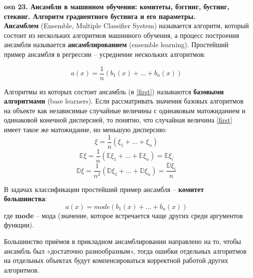 \renewcommand{\theequation}{\arabic{equation}}
\setcounter{equation}{0}


\textbf{\LARGE osn 23. Ансамбли в машинном обучении: комитеты, бэггинг, бустинг, стекинг. Алгоритм градиентного бустинга и его параметры.}  \\
\textbf{Ансамблем} (Ensemble, Multiple Classifier System) называется алгоритм, который состоит из нескольких алгоритмов машинного обучения, а процесс построения ансамбля называется \textbf {ансамблированием} (ensemble learning). Простейший пример ансамбля в регрессии – усреднение нескольких алгоритмов:

\begin{equation}\label{first}
a(x) = \frac{1}{n}(b_1(x)+...+b_n(x))
\end{equation}

Алгоритмы из которых состоит ансамбль (в \ref{first}) называются \textbf{базовыми алгоритмами} (base learners). Если рассматривать значения базовых алгоритмов на объекте  как независимые случайные величины с одинаковым матожиданием  и одинаковой конечной дисперсией, то понятно, что случайная величина \ref{first} имеет такое же матожидание, но меньшую дисперсию:
\begin{equation}
    \xi = \frac{1}{n}(\xi_1+...+\xi_n) 
\end{equation}
\begin{equation}
    \mathbb{E}\xi=\frac{1}{n}(\mathbb{E}\xi_1+...+\mathbb{E}\xi_n)=\mathbb{E}\xi_i
\end{equation}
\begin{equation}
    \mathbb{D}\xi=\frac{1}{n^2}(\mathbb{D}\xi_1+...+\mathbb{D}\xi_n)=\frac{\mathbb{D}\xi_i}{n}
\end{equation}

В задачах классификации простейший пример ансамбля – \textbf{комитет большинства}:
\begin{equation}\label{komitet}
a(x) = mode(b_1(x)+...+b_n(x))
\end{equation}
где  \textbf{mode} – мода (значение, которое встречается чаще других среди аргументов функции). 

Большинство приёмов в прикладном ансамблировании направлено на то, чтобы ансамбль был «достаточно разнообразным», тогда ошибки отдельных алгоритмов на отдельных объектах будут компенсироваться корректной работой других алгоритмов. 


